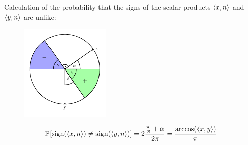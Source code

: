 	\begin{frame}
		\begin{pbmr}
			Calculation of the probability that the signs of the scalar products $\langle{x},{n}\rangle$ and $\langle{y},{n}\rangle$ are unlike:
			\begin{figure}
				\begin{center}
					\includegraphics[width=0.38\textwidth]{ChapersPresentation/fig_unit_circle.pdf}
				\end{center}
				\vspace{-2em}
			\end{figure}
			\begin{align*}
				\mathbb{P}[\operatorname{sign}(\langle{x},{n}\rangle)\neq\operatorname{sign}(\langle{y},{n}\rangle)]=2\frac{\frac{\pi}{2}+\alpha}{2\pi} = \frac{\arccos(\langle{x},{y}\rangle)}{\pi}
			\end{align*}
		\end{pbmr}
	\end{frame}
	
